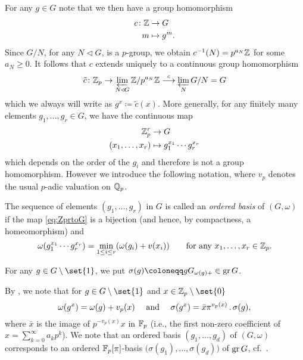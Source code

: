 For any $g\in G$ note that we then have a group homomorphism
\begin{align*}
  c\colon \mathbb{Z} &\to G\\
  m &\mapsto g^m.
\end{align*}
Since $G/N$, for any $N \triangleleft G$, is a $p$-group, we obtain $c^{-1}(N) = p^{a_N}\mathbb{Z}$ for some $a_N\geq0$. It follows that $c$ extends uniquely to a continuous group homomorphism
\begin{equation*}
  \tilde{c} \colon \mathbb{Z}_p \to \varprojlim_{N \triangleleft G} \mathbb{Z}/p^{a_N}\mathbb{Z} \overset{c}{\longrightarrow} \varprojlim_N G/N = G
\end{equation*}
which we always will write as $g^x \coloneqq \tilde{c}(x)$. More generally, for any finitely many elements $g_1,\dotsc,g_r\in G$, we have the continuous map
\begin{equation}\label{eq:ZprtoG}
  \begin{aligned}
    \mathbb{Z}_p^r &\to G \\
    (x_1,\dotsc,x_r) &\mapsto g_1^{x_1}\dotsb g_r^{x_r}
  \end{aligned}
\end{equation}
which depends on the order of the $g_i$ and therefore is not a group homomorphism. However we introduce the following notation, where $v_{p}$ denotes the usual $p$-adic valuation on $\mathbb{Q}_p$.
\begin{definition}
  The sequence of elements $(g_1,\dotsc,g_r)$ in $G$ is called an \emph{ordered basis} of $(G,\omega)$ if the map \eqref{eq:ZprtoG} is a bijection (and hence, by compactness, a homeomorphism) and
  \begin{equation*}
    \omega(g_1^{x_1}\dotsb g_r^{x_r}) = \min_{1 \leq i \leq r}(\omega(g_i)+v(x_i)) \qquad \text{for any } x_1,\dotsc,x_r\in\mathbb{Z}_p.
  \end{equation*}
\end{definition}

\begin{definition}
  For any $g \in G \setminus \set{1}$, we put $\sigma(g) \coloneqq gG_{\omega(g)+} \in \gr G$.
\end{definition}

By \cite[Remark~26.3]{Sch}, we note that for $g \in G \setminus \set{1}$ and $x \in \Z_{p} \setminus \set{0}$
\begin{equation}
  \label{eq:sigma-gx}
  \omega(g^{x}) = \omega(g) + v_{p}(x) \quad \text{ and } \quad \sigma(g^{x}) = \bar{x}\pi^{v_{p}(x)} \,.\, \sigma(g),
\end{equation}
where $\bar{x}$ is the image of $p^{-v_{p}(x)}x$ in $\mathbb{F}_{p}$ (i.e., the first non-zero coefficient of $x = \sum_{k=0}^{\infty} a_{k}p^{k}$). We note that an ordered basis $(g_{1},\dotsc,g_{d})$ of $(G,\omega)$ corresponds to an ordered $\mathbb{F}_{p}[\pi]$-basis $\bigl( \sigma(g_{1}), \dotsc, \sigma(g_{d}) \bigr)$ of $\operatorname{gr} G$, cf.\ \cite[Prop.~26.5]{Sch}.


